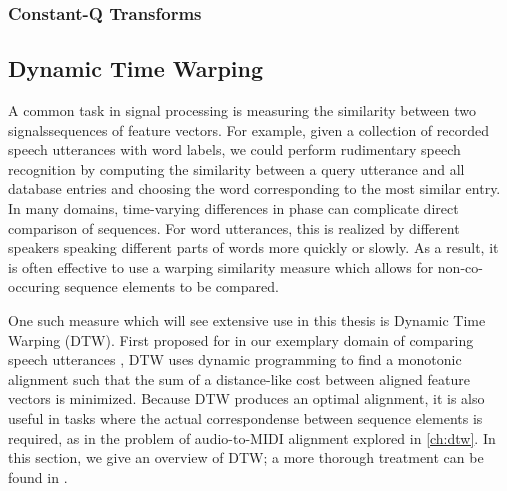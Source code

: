 \subsubsection{Constant-Q Transforms}

\subsection{Dynamic Time Warping}
\label{sec:dtw}

A common task in signal processing is measuring the similarity between two signalssequences of feature vectors.
For example, given a collection of recorded speech utterances with word labels, we could perform rudimentary speech recognition by computing the similarity between a query utterance and all database entries and choosing the word corresponding to the most similar entry.
In many domains, time-varying differences in phase can complicate direct comparison of sequences.
For word utterances, this is realized by different speakers speaking different parts of words more quickly or slowly.
As a result, it is often effective to use a warping similarity measure which allows for non-co-occuring sequence elements to be compared.

One such measure which will see extensive use in this thesis is Dynamic Time Warping (DTW).
First proposed for in our exemplary domain of comparing speech utterances \cite{sakoe1978dynamic}, DTW uses dynamic programming to find a monotonic alignment such that the sum of a distance-like cost between aligned feature vectors is minimized.
Because DTW produces an optimal alignment, it is also useful in tasks where the actual correspondense between sequence elements is required, as in the problem of audio-to-MIDI alignment explored in \cref{ch:dtw}.
In this section, we give an overview of DTW; a more thorough treatment can be found in \cite{muller2007dynamic}.

